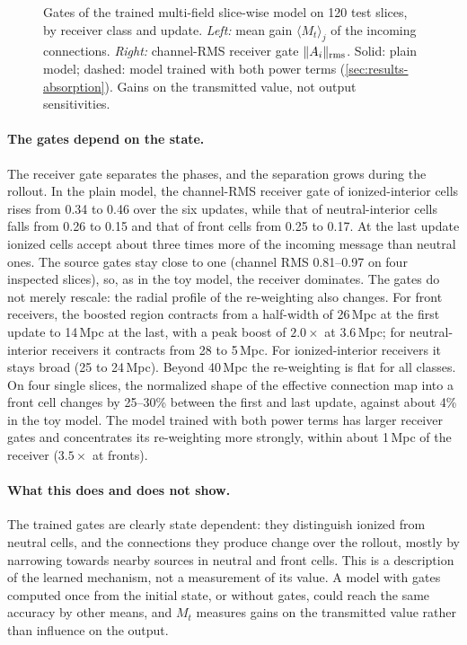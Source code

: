 \begin{figure}[!tp]
  \centering
  \caption{Gates of the trained multi-field slice-wise model on 120 test slices, by receiver class and update. \emph{Left:} mean gain $\langle M_t\rangle_j$ of the incoming connections. \emph{Right:} channel-RMS receiver gate $\lVert A_i\rVert_{\mathrm{rms}}$. Solid: plain model; dashed: model trained with both power terms (\cref{sec:results-absorption}). Gains on the transmitted value, not output sensitivities.}
  \label{fig:mf-gates}
\end{figure}

\paragraph{The gates depend on the state.} The receiver gate separates the phases, and the separation grows during the rollout. In the plain model, the channel-RMS receiver gate of ionized-interior cells rises from 0.34 to 0.46 over the six updates, while that of neutral-interior cells falls from 0.26 to 0.15 and that of front cells from 0.25 to 0.17. At the last update ionized cells accept about three times more of the incoming message than neutral ones. The source gates stay close to one (channel RMS 0.81--0.97 on four inspected slices), so, as in the toy model, the receiver dominates. The gates do not merely rescale: the radial profile of the re-weighting also changes. For front receivers, the boosted region contracts from a half-width of 26\,Mpc at the first update to 14\,Mpc at the last, with a peak boost of $2.0\times$ at 3.6\,Mpc; for neutral-interior receivers it contracts from 28 to 5\,Mpc. For ionized-interior receivers it stays broad (25 to 24\,Mpc). Beyond 40\,Mpc the re-weighting is flat for all classes. On four single slices, the normalized shape of the effective connection map into a front cell changes by 25--30\% between the first and last update, against about 4\% in the toy model. The model trained with both power terms has larger receiver gates and concentrates its re-weighting more strongly, within about 1\,Mpc of the receiver ($3.5\times$ at fronts).

\paragraph{What this does and does not show.} The trained gates are clearly state dependent: they distinguish ionized from neutral cells, and the connections they produce change over the rollout, mostly by narrowing towards nearby sources in neutral and front cells. This is a description of the learned mechanism, not a measurement of its value. A model with gates computed once from the initial state, or without gates, could reach the same accuracy by other means, and $M_t$ measures gains on the transmitted value rather than influence on the output.

